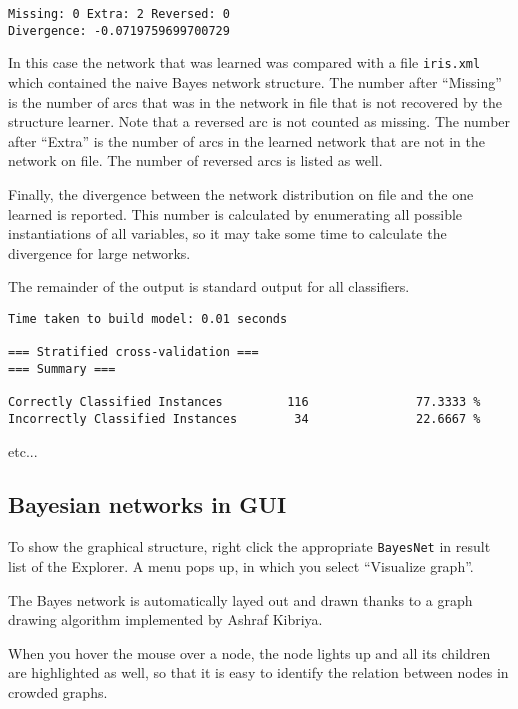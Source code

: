 \documentclass[a4paper]{article}
\begin{document}
\begin{verbatim}
Missing: 0 Extra: 2 Reversed: 0
Divergence: -0.0719759699700729
\end{verbatim}

In this case the network that was learned was compared with a file {\tt iris.xml}
which contained the naive Bayes network structure. The number after ``Missing''
is the number of arcs that was in the network in file that is not recovered by
the structure learner. Note that a reversed arc is not counted as missing.
The number after ``Extra'' is the number of arcs in the learned network that are
not in the network on file. The number of reversed arcs is listed as well.

Finally, the divergence between the network distribution on file and the one learned
is reported. This number is calculated by enumerating all possible instantiations
of all variables, so it may take some time to calculate the divergence for large
networks.

The remainder of the output is standard output for all classifiers. 
\begin{verbatim}
Time taken to build model: 0.01 seconds

=== Stratified cross-validation ===
=== Summary ===

Correctly Classified Instances         116               77.3333 %
Incorrectly Classified Instances        34               22.6667 %
\end{verbatim}
etc...

\subsection*{Bayesian networks in GUI}

To show the graphical structure, right click the appropriate \texttt{BayesNet} in result list of
the Explorer. A menu pops up, in which you select ``Visualize graph''.

\begin{center}
\end{center}

The Bayes network is automatically layed out and drawn thanks to a graph drawing algorithm
implemented by Ashraf Kibriya.

\begin{center}
\end{center}

When you hover the mouse over a node, the node lights up and all its children are highlighted
as well, so that it is easy to identify the relation between nodes in crowded graphs.
\end{document}

